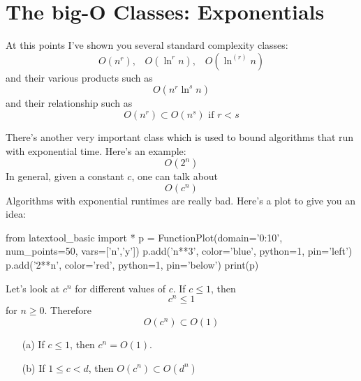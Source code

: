 \section{The big-O Classes: Exponentials}
 
At this points I've shown you several standard complexity classes:
\[
O(n^r), \,\,\,\,\,
O(\ln^r n), \,\,\,\,\,
O(\ln^{(r)} n)
\]
and their various products such as
\[
O(n^r \ln^s n)
\]
and their relationship such as
\[
O(n^r) \subset O(n^s) \text{ if $r < s$}
\]

There's another very important class which is used to 
bound algorithms that run with exponential time.
Here's an example:
\[
O(2^n)
\]
In general, given a constant $c$, one can talk about 
\[
O(c^n)
\]
Algorithms with exponential runtimes are really bad.
Here's a plot to give you an idea:
\begin{python}
from latextool_basic import *
p = FunctionPlot(domain='0:10', num_points=50, vars=['n','y'])
p.add('n**3', color='blue', python=1, pin='left')
p.add('2**n', color='red', python=1, pin='below')
print(p)
\end{python}

Let's look at $c^n$ for different values of $c$.
If $c \leq 1$, then
\[
c^n \leq 1
\]
for $n \geq 0$. Therefore
\[
O(c^n) \subset O(1)
\]

\begin{thm}\mbox{}
\begin{itemize}
\item[(a)] If $c \leq 1$, then $c^n = O(1)$. 
\item[(b)] If $1 \leq c < d$, then $O(c^n) \subset O(d^n)$
\end{itemize}
\end{thm}

